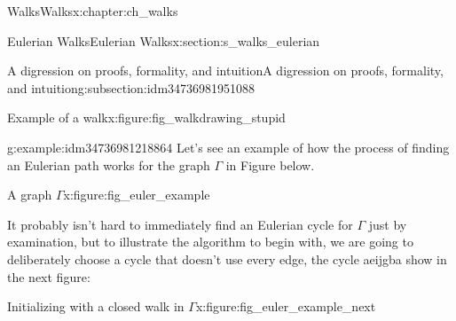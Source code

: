 \documentclass[oneside,10pt,]{book}
\numberwithin{equation}{section}
\begin{document}
\begin{chapterptx}{Walks}{}{Walks}{}{}{x:chapter:ch_walks}
\begin{sectionptx}{Eulerian Walks}{}{Eulerian Walks}{}{}{x:section:s_walks_eulerian}
\begin{subsectionptx}{A digression on proofs, formality, and intuition}{}{A digression on proofs, formality, and intuition}{}{}{g:subsection:idm34736981951088}
\begin{figureptx}{Example of a walk}{x:figure:fig_walkdrawing_stupid}{}
\begin{image}{0.15}{0.7}{0.15}
{
}%
\end{image}%
\tcblower
\end{figureptx}%
\begin{example}{}{g:example:idm34736981218864}%
Let's see an example of how the process of finding an Eulerian path works for the graph \(\Gamma\) in Figure below.%
\begin{figureptx}{A graph \(\Gamma\)}{x:figure:fig_euler_example}{}%
\begin{image}{0.15}{0.7}{0.15}%
%
\end{image}%
\tcblower
\end{figureptx}%
It probably isn't hard to immediately find an Eulerian cycle for \(\Gamma\) just by examination, but to illustrate the algorithm to begin with, we are going to deliberately choose a cycle that doesn't use every edge, the cycle aeijgba show in the next figure:%
\begin{figureptx}{Initializing with a closed walk in \(\Gamma\)}{x:figure:fig_euler_example_next}{}%
\begin{image}{0.15}{0.7}{0.15}%
\end{image}
\end{figureptx}
\end{example}
\end{subsectionptx}
\end{sectionptx}
\end{chapterptx}
\end{document}
